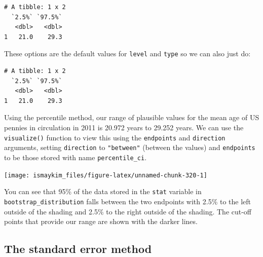 \documentclass[12pt,]{krantz}
\makeatletter
\newenvironment{Shaded}{\begin{snugshade}}{\end{snugshade}}
\newcommand{\KeywordTok}[1]{\textcolor[rgb]{0.27,0.27,0.27}{\textbf{#1}}}
\newcommand{\DataTypeTok}[1]{\textcolor[rgb]{0.27,0.27,0.27}{#1}}
\newcommand{\StringTok}[1]{\textcolor[rgb]{0.5,0.5,0.5}{#1}}
\newcommand{\OperatorTok}[1]{\textcolor[rgb]{0.43,0.43,0.43}{\textbf{#1}}}
\newcommand{\NormalTok}[1]{#1}
\newenvironment{kframe}{%
\medskip{}
\setlength{\fboxsep}{.8em}
 \def\at@end@of@kframe{}%
 \ifinner\ifhmode%
  \def\at@end@of@kframe{\end{minipage}}%
  \begin{minipage}{\columnwidth}%
 \fi\fi%
 \def\FrameCommand##1{\hskip\@totalleftmargin \hskip-\fboxsep
 \colorbox{shadecolor}{##1}\hskip-\fboxsep
     \hskip-\linewidth \hskip-\@totalleftmargin \hskip\columnwidth}%
 \MakeFramed {\advance\hsize-\width
   \@totalleftmargin\z@ \linewidth\hsize
   \@setminipage}}%
 {\par\unskip\endMakeFramed%
 \at@end@of@kframe}
\renewenvironment{Shaded}{\begin{kframe}}{\end{kframe}}
\makeatother
\begin{document}
\begin{verbatim}
# A tibble: 1 x 2
  `2.5%` `97.5%`
   <dbl>   <dbl>
1   21.0    29.3
\end{verbatim}

These options are the default values for \texttt{level} and
\texttt{type} so we can also just do:

\begin{Shaded}
\end{Shaded}

\begin{verbatim}
# A tibble: 1 x 2
  `2.5%` `97.5%`
   <dbl>   <dbl>
1   21.0    29.3
\end{verbatim}

Using the percentile method, our range of plausible values for the mean
age of US pennies in circulation in 2011 is 20.972 years to 29.252
years. We can use the \texttt{visualize()} function to view this using
the \texttt{endpoints} and \texttt{direction} arguments, setting
\texttt{direction} to \texttt{"between"} (between the values) and
\texttt{endpoints} to be those stored with name \texttt{percentile\_ci}.

\begin{Shaded}
\end{Shaded}

\begin{center}\texttt{[image: ismaykim\_files/figure-latex/unnamed-chunk-320-1]} \end{center}

You can see that 95\% of the data stored in the \texttt{stat} variable
in \texttt{bootstrap\_distribution} falls between the two endpoints with
2.5\% to the left outside of the shading and 2.5\% to the right outside
of the shading. The cut-off points that provide our range are shown with
the darker lines.

\subsection{The standard error method}\label{the-standard-error-method}
\end{document}
